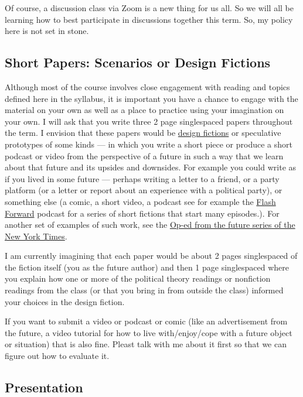\documentclass[letterpaper]{inzane_syllabus} %
\begin{document}
Of course, a discussion class via Zoom is a new thing for us all. So we will
all be learning how to best participate in discussions together this term. So,
my policy here is not set in stone.

\subsection{Short Papers: Scenarios or Design Fictions}

Although most of the course involves close engagement with reading and topics defined here in the syllabus, it is important you have a chance to engage with the material on your own as well as a place to practice using your imagination on your own. I will ask that you write three 2 page singlespaced papers throughout the term. I envision that these papers would be \href{https://en.wikipedia.org/wiki/Design_fiction}{design fictions} or speculative prototypes of some kinds --- in which you write a short piece or produce a short podcast or video from the perspective of a future in such a way that we learn about that future and its upsides and downsides.  For example you could write as if you lived in some future --- perhaps writing a letter to a friend, or a party platform (or a letter or report about an experience with a political party), or something else (a comic, a short video, a podcast see for example the \href{http://roseveleth.com/}{Flash Forward} podcast for a series of short fictions that start many episodes.). For another set of examples of such work, see the \href{https://www.nytimes.com/spotlight/future-oped}{Op-ed from the future series of the New York Times}.

I am currently imagining that each paper would be about 2 pages singlespaced of
the fiction itself (you as the future author) and then 1 page singlespaced
where you explain how one or more of the political theory readings or
nonfiction readings from the class (or that you bring in from outside the
class) informed your choices in the design fiction.

If you want to submit a video or podcast or comic (like an advertisement from
the future, a video tutorial for how to live with/enjoy/cope with a future
object or situation) that is also fine. Pleast talk with me about it first so
that we can figure out how to evaluate it.

\subsection{Presentation}
\end{document}
